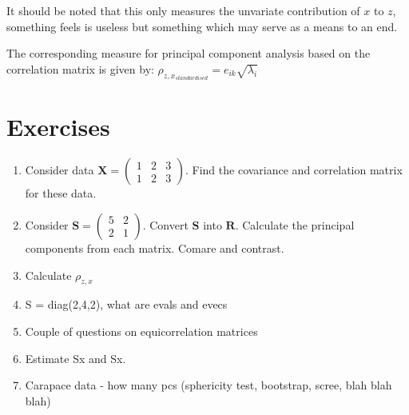It should be noted that this only measures the unvariate contribution of $x$ to $z$, something \cite{Rencher:2002} feels is useless but something which may serve as a means to an end.

The corresponding measure for principal component analysis based on the correlation matrix is given by:
$\rho_{z, x_{standardised}} = e_{ik} \sqrt{\lambda_{i}}$


\section{Exercises}

\begin{enumerate}

\item Consider data $\boldsymbol{X} = \left( \begin{array}{ccc} 1 & 2 & 3 \\ 1 & 2 & 3 \end{array} \right) $.   Find the covariance and correlation matrix for these data.

\item Consider $\boldsymbol{S} = \left( \begin{array}{cc} 5 & 2 \\ 2 & 1 \end{array} \right) $.   Convert $\boldsymbol{S}$ into $\boldsymbol{R}$.   Calculate the principal components from each matrix.   Comare and contrast.   

\item Calculate $\rho_{z, x}$

\item S = diag(2,4,2), what are evals and evecs

\item Couple of questions on equicorrelation matrices

\item Estimate Sx and Sx.

\item Carapace data - how many pcs (sphericity test, bootstrap, scree, blah blah blah)

\end{enumerate}

